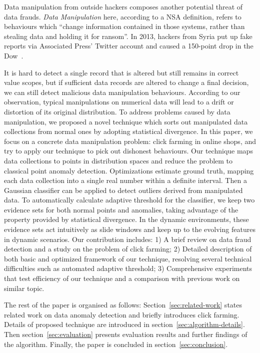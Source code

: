 \documentclass{article}
\begin{document}
		Data manipulation from outside hackers composes another potential threat of data frauds. \textit{Data Manipulation} here, according to a NSA definition, refers to behaviours which ``change information contained in those systems, rather than stealing data and holding it for ransom''.
		In 2013, hackers from Syria put up fake reports via Associated Press' Twitter account and caused a 150-point drop in the Dow~\cite{SyriaHacker}.
		
		It is hard to detect a single record that is altered but still remains in correct value scopes, but if sufficient data records are altered to change a final decision, we can still detect malicious data manipulation behaviours.
		According to our observation, typical manipulations on numerical data will lead to a drift or distortion of its original distribution.
		To address problems caused by data manipulation, we proposed a novel technique which sorts out manipulated data collections from normal ones by adopting statistical divergence.
		In this paper, we focus on a concrete data manipulation problem: click farming in online shops, and try to apply our technique to pick out dishonest behaviours.
		Our technique maps data collections to points in distribution spaces and reduce the problem to classical point anomaly detection.
		Optimizations estimate ground truth, mapping each data collection into a single real number within a definite interval. Then a Gaussian classifier can be applied to detect outliers derived from manipulated data. To automatically calculate adaptive threshold for the classifier, we keep two evidence sets for both normal points and anomalies, taking advantage of the property provided by statistical divergence.
		In the dynamic environments, these evidence sets act intuitively as slide windows and keep up to the evolving features in dynamic scenarios.
		Our contribution includes: 1) A brief review on data fraud detection and a study on the problem of click farming; 2) Detailed description of both basic and optimized framework of our technique, resolving several technical difficulties such as automated adaptive threshold; 3) Comprehensive experiments that test efficiency of our technique and a comparison with previous work on similar topic.
		
		The rest of the paper is organised as follows: Section~\ref{sec:related-work} states related work on data anomaly detection and briefly introduces click farming.
		Details of proposed technique are introduced in section~\ref{sec:algorithm-details}. Then section~\ref{sec:evaluation} presents evaluation results and further findings of the algorithm. Finally, the paper is concluded in section~\ref{sec:conclusion}.
		
\end{document}
